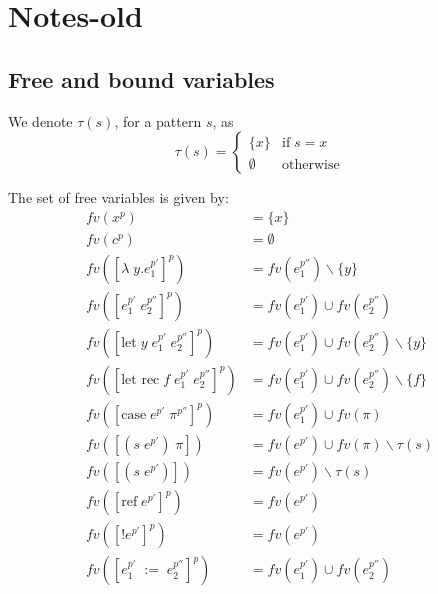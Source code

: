 \documentclass[../../master.tex]{subfiles}
\begin{document}
\section{Notes-old}

\subsection{Free and bound variables}
We denote $\tau(s)$, for a pattern $s$, as
$$
	\tau(s)=
		\left\{\begin{matrix}
			\{x\} & \mbox{if}\;s=x\\ 
			\emptyset & \mbox{otherwise}
		\end{matrix}\right.
$$

\begin{definition}\label{def:fv}
	The set of free variables is given by:
	\begin{align*}
		fv(x^p)&=\{x\}\\
		fv(c^p)&=\emptyset\\
		fv([\lambda\;y.e_1^{p'}]^p)&=fv(e_1^{p''})\backslash\{y\}\\
		fv([e_1^{p'}\;e_2^{p''}]^p)&=fv(e_1^{p'})\cup fv(e_2^{p''})\\
		fv([\mbox{let}\;y\;e_1^{p'}\;e_2^{p''}]^p)&=fv(e_1^{p'})\cup fv(e_2^{p''})\backslash\{y\}\\
		fv([\mbox{let rec}\;f\;e_1^{p'}\;e_2^{p''}]^p)&=fv(e_1^{p'})\cup fv(e_2^{p''})\backslash\{f\}\\
		fv([\mbox{case}\;e^{p'}\;\pi^{p''}]^p)&=fv(e_1^{p'})\cup fv(\pi)\\
		fv([(s\;e^{p'})\;\pi])&=fv(e^{p'})\cup fv(\pi)\backslash\tau(s)\\
		fv([(s\;e^{p'})])&=fv(e^{p'})\backslash\tau(s)\\
		fv([\mbox{ref}\;e^{p'}]^p)&=fv(e^{p'})\\
		fv([!e^{p'}]^p)&=fv(e^{p'})\\
		fv([e_1^{p'}\;:=\;e_2^{p''}]^p)&=fv(e_1^{p'})\cup fv(e_2^{p''})\\
	\end{align*}
\end{definition}
\end{document}
